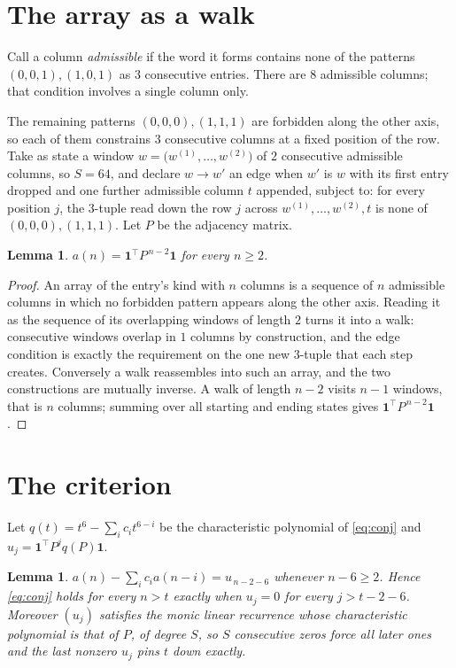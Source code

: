 \documentclass[11pt,a4paper]{article}
\theoremstyle{plain}
\newtheorem{lemma}[theorem]{Lemma}
\theoremstyle{definition}
\begin{document}
\section{The array as a walk}

Call a column \emph{admissible} if the word it forms contains none of the patterns
$(0,0,1), (1,0,1)$ as $3$ consecutive entries. There are $8$ admissible columns; that condition
involves a single column only.

The remaining patterns $(0,0,0), (1,1,1)$ are forbidden along the other axis, so each of them
constrains $3$ consecutive columns at a fixed position of the row. Take as state a
window $w=\bigl(w^{(1)},\dots,w^{(2)}\bigr)$ of $2$ consecutive admissible
columns, so $S=64$, and declare $w\to w'$ an edge when $w'$ is $w$ with its first entry
dropped and one further admissible column $t$ appended, subject to: for every position
$j$, the $3$-tuple read down the row $j$ across $w^{(1)},\dots,w^{(2)},t$
is none of $(0,0,0), (1,1,1)$. Let $P$ be the adjacency matrix.

\begin{lemma}\label{lem:walk}
$a(n)=\mathbf{1}^{\!\top}P^{\,n-2}\mathbf{1}$ for every $n\ge2$.
\end{lemma}

\begin{proof}
An array of the entry's kind with $n$ columns is a sequence of $n$ admissible columns in
which no forbidden pattern appears along the other axis. Reading it as the sequence of its
overlapping windows of length $2$ turns it into a walk: consecutive windows overlap in
$1$ columns by construction, and the edge condition is exactly the requirement on the one
new $3$-tuple that each step creates. Conversely a walk reassembles into such an array,
and the two constructions are mutually inverse. A walk of length $n-2$ visits $n-1$
windows, that is $n$ columns; summing over all starting and ending states gives
$\mathbf{1}^{\!\top}P^{\,n-2}\mathbf{1}$.
\end{proof}

\section{The criterion}

Let $q(t)=t^{6}-\sum_i c_i t^{6-i}$ be the characteristic polynomial of
\eqref{eq:conj} and $u_j=\mathbf{1}^{\!\top}P^{j}q(P)\mathbf{1}$.

\begin{lemma}\label{lem:crit}
$a(n)-\sum_i c_i a(n-i)=u_{\,n-2-6}$ whenever $n-6\ge2$. Hence
\eqref{eq:conj} holds for every $n>t$ exactly when $u_j=0$ for every
$j>t-2-6$. Moreover $(u_j)$ satisfies the monic linear recurrence whose
characteristic polynomial is that of $P$, of degree $S$, so $S$ consecutive zeros force all
later ones and the last nonzero $u_j$ pins $t$ down exactly.
\end{lemma}
\end{document}

